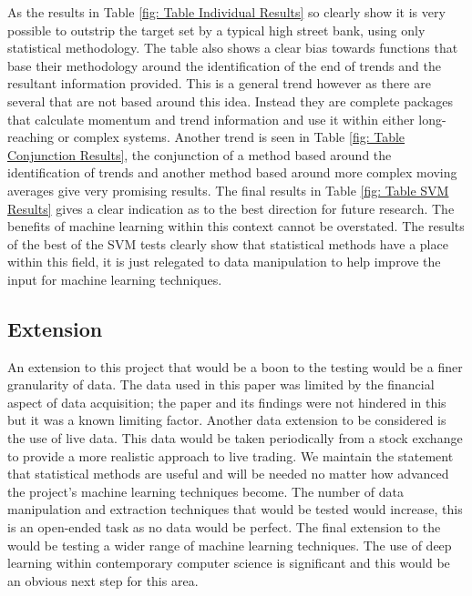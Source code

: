 \documentclass[conference]{IEEEtran}
\begin{document}
As the results in Table \ref{fig: Table Individual Results} so clearly show it is very possible to outstrip the target set by a typical high street bank, using only statistical methodology. The table also shows a clear bias towards functions that base their methodology around the identification of the end of trends and the resultant information provided. This is a general trend however as there are several that are not based around this idea. Instead they are complete packages that calculate momentum and trend information and use it within either long-reaching or complex systems. 
Another trend is seen in Table \ref{fig: Table Conjunction Results}, the conjunction of a method based around the identification of trends and another method based around more complex moving averages give very promising results. 
The final results in Table \ref{fig: Table SVM Results} gives a clear indication as to the best direction for future research. The benefits of machine learning within this context cannot be overstated. The results of the best of the SVM tests clearly show that statistical methods have a place within this field, it is just relegated to data manipulation to help improve the input for machine learning techniques.\\

\subsection{Extension}

An extension to this project that would be a boon to the testing would be a finer granularity of data. The data used in this paper was limited by the financial aspect of data acquisition; the paper and its findings were not hindered in this but it was a known limiting factor. Another data extension to be  considered is the use of live data. This data would be taken periodically from a stock exchange to provide a more realistic approach to live trading. We maintain the statement that statistical methods are useful and will be needed no matter how advanced the project's machine learning techniques become. The number of data manipulation and extraction techniques that would be tested would increase, this is an open-ended task as no data would be perfect. The final extension to the would be testing a wider range of machine learning techniques. The use of deep learning within contemporary computer science is significant and this would be an obvious next step for this area.

\end{document}
